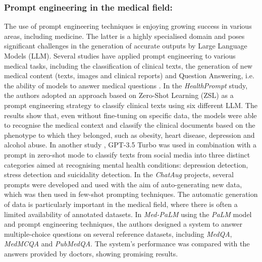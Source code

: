 \subsubsection{Prompt engineering in the medical field:}
The use of prompt engineering techniques is enjoying growing success in various areas, including medicine. The latter is a highly specialised domain and poses significant challenges in the generation of accurate outputs by Large Language Models (LLM). Several studies have applied prompt engineering to various medical tasks, including the classification of clinical texts, the generation of new medical content (texts, images and clinical reports) and Question Answering,  i.e. the ability of models to answer medical questions \cite{wang2021prompt}.
In the \textit{HealthPrompt}\cite{sivarajkumar2022healthpromptzeroshotlearningparadigm} study, the authors adopted an approach based on Zero-Shot Learning (ZSL) as a prompt engineering strategy to classify clinical texts using six different LLM. The results show that, even without fine-tuning on specific data, the models were able to recognise the medical context and classify the clinical documents based on the phenotype to which they belonged, such as obesity, heart disease, depression and alcohol abuse.
In another study \cite{lamichhane2023evaluationchatgptnlpbasedmental}, GPT-3.5 Turbo was used in combination with a prompt in zero-shot mode to classify texts from social media into three distinct categories aimed at recognising mental health conditions: depression detection, stress detection and suicidality detection.
In the \textit{ChatAug}\cite{dai2023auggptleveragingchatgpttext} projects, several prompts were developed and used with the aim of auto-generating new data, which was then used in few-shot prompting techniques. The automatic generation of data is particularly important in the medical field, where there is often a limited availability of annotated datasets.
In \textit{Med-PaLM} \cite{tuli2023large} using the \textit{PaLM} model \cite{Palm}  and prompt engineering techniques, the authors designed a system to answer multiple-choice questions on several reference datasets, including \textit{MedQA}, \textit{MedMCQA} and  \textit{PubMedQA}. The system's performance was compared with the answers provided by doctors, showing promising results.
